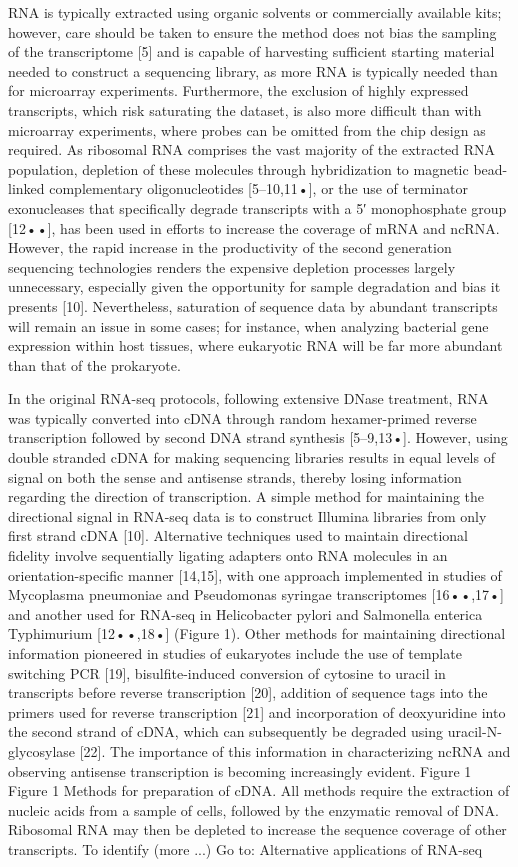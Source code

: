 \documentclass[a4paper]{thesis}
\begin{document}
RNA is typically extracted using organic solvents or commercially available kits; however, care should be taken to ensure the method does not bias the sampling of the transcriptome [5] and is capable of harvesting sufficient starting material needed to construct a sequencing library, as more RNA is typically needed than for microarray experiments. Furthermore, the exclusion of highly expressed transcripts, which risk saturating the dataset, is also more difficult than with microarray experiments, where probes can be omitted from the chip design as required. As ribosomal RNA comprises the vast majority of the extracted RNA population, depletion of these molecules through hybridization to magnetic bead-linked complementary oligonucleotides [5–10,11•], or the use of terminator exonucleases that specifically degrade transcripts with a 5′ monophosphate group [12••], has been used in efforts to increase the coverage of mRNA and ncRNA. However, the rapid increase in the productivity of the second generation sequencing technologies renders the expensive depletion processes largely unnecessary, especially given the opportunity for sample degradation and bias it presents [10]. Nevertheless, saturation of sequence data by abundant transcripts will remain an issue in some cases; for instance, when analyzing bacterial gene expression within host tissues, where eukaryotic RNA will be far more abundant than that of the prokaryote.

In the original RNA-seq protocols, following extensive DNase treatment, RNA was typically converted into cDNA through random hexamer-primed reverse transcription followed by second DNA strand synthesis [5–9,13•]. However, using double stranded cDNA for making sequencing libraries results in equal levels of signal on both the sense and antisense strands, thereby losing information regarding the direction of transcription. A simple method for maintaining the directional signal in RNA-seq data is to construct Illumina libraries from only first strand cDNA [10]. Alternative techniques used to maintain directional fidelity involve sequentially ligating adapters onto RNA molecules in an orientation-specific manner [14,15], with one approach implemented in studies of Mycoplasma pneumoniae and Pseudomonas syringae transcriptomes [16••,17•] and another used for RNA-seq in Helicobacter pylori and Salmonella enterica Typhimurium [12••,18•] (Figure 1). Other methods for maintaining directional information pioneered in studies of eukaryotes include the use of template switching PCR [19], bisulfite-induced conversion of cytosine to uracil in transcripts before reverse transcription [20], addition of sequence tags into the primers used for reverse transcription [21] and incorporation of deoxyuridine into the second strand of cDNA, which can subsequently be degraded using uracil-N-glycosylase [22]. The importance of this information in characterizing ncRNA and observing antisense transcription is becoming increasingly evident.
Figure 1
Figure 1
Methods for preparation of cDNA. All methods require the extraction of nucleic acids from a sample of cells, followed by the enzymatic removal of DNA. Ribosomal RNA may then be depleted to increase the sequence coverage of other transcripts. To identify (more ...)
Go to:
Alternative applications of RNA-seq
\end{document}
